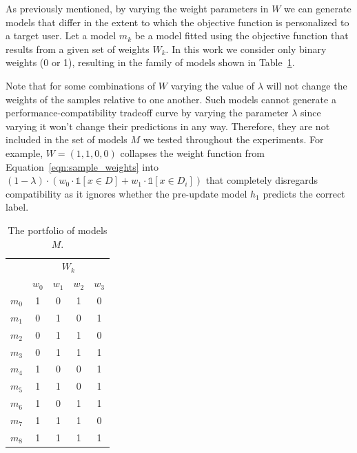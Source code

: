 \documentclass[letterpaper]{article}
\theoremstyle{definition}
\newcommand{\kibitz}[2]{\ifnum\Comments=1{\color{#1}{#2}}\fi}
\newcommand{\ym}[1]{\kibitz{blue}{[YM:#1]}}
\newcommand{\li}[1]{\kibitz{brown}{[LL:#1]}}
\begin{document}
As previously mentioned, by varying the weight parameters in $W$ we can generate models that differ in the extent to which the objective function is personalized to a target user. Let a model $m_k$ be a model fitted using the objective function that results from a given set of weights $W_k$. In this work we consider only binary weights (0 or 1), resulting in the family of models shown in Table~\ref{tab:models}.

\li{I don't understand what comes next. Once we polish this explanation we should probably move it to the end of the previous paragraph. The reader will be asking the question of where are the other models in the table 1 as soon as we mention it.}\ym{moved it, but I'm not sure how to improve it} Note that for some combinations of $W$ varying the value of  $\lambda$ will not change the weights of the samples relative to one another. Such models cannot generate a performance-compatibility tradeoff curve by varying the parameter $\lambda$ since varying it won't change their predictions in any way. Therefore, they are not included in the set of models $M$ we tested throughout the experiments. For example, $W=(1,1,0,0)$ collapses the weight function from Equation~\ref{eqn:sample_weights} into $(1-\lambda)\cdot (w_0\cdot \mathbb{1}[x\in D]+w_1\cdot \mathbb{1}[x\in D_i])$ that completely disregards compatibility as it ignores whether the pre-update model $h_1$ predicts the correct label.

\begin{table}
\begin{center}
{
\setlength{\tabcolsep}{4pt}
\begin{tabular}{c|cccc}
\hline
\rule{0pt}{6pt}
\multirow{2}{*}{model}&\multicolumn{4}{c}{$W_k$}\\
&$w_0$&$w_1$&$w_2$&$w_3$
\rule{0pt}{6pt}
\\\hline
$m_0$&1&0&1&0\\
$m_1$&0&1&0&1\\
$m_2$&0&1&1&0\\
$m_3$&0&1&1&1\\
$m_4$&1&0&0&1\\
$m_5$&1&1&0&1\\
$m_6$&1&0&1&1\\
$m_7$&1&1&1&0\\
$m_8$&1&1&1&1
\\\hline
\end{tabular}
\caption{The portfolio of models $M$.}
\label{tab:models}}
\end{center}
\end{table}
\end{document}
